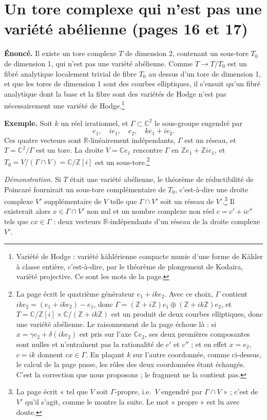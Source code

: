 \documentclass[11pt,a4paper]{article}
\begin{document}
\section*{Un tore complexe qui n'est pas une variété abélienne (pages 16 et 17)}

\textbf{Énoncé.} Il existe un tore complexe $T$ de dimension 2, contenant un
sous-tore $T_{0}$ de dimension 1, qui n'est pas une variété abélienne. Comme
$T \to T/T_{0}$ est un fibré analytique localement trivial de fibre $T_{0}$ au
dessus d'un tore de dimension 1, et que les tores de dimension 1 sont des
courbes elliptiques, il s'ensuit qu'un fibré analytique dont la base et la
fibre sont des variétés de Hodge n'est pas nécessairement une variété de
Hodge.\footnote{Variété de Hodge : variété kählérienne compacte munie d'une
forme de Kähler à classe entière, c'est-à-dire, par le théorème de plongement
de Kodaira, variété projective. Ce sont les mots de la page.}

\textbf{Exemple.} Soit $k$ un réel irrationnel, et $\Gamma \subset
\mathbb{C}^{2}$ le sous-groupe engendré par
\[
  e_{1}, \quad ie_{1}, \quad e_{2}, \quad ke_{1} + ie_{2} .
\]
Ces quatre vecteurs sont $\mathbb{R}$-linéairement indépendants, $\Gamma$ est un
réseau, et $T = \mathbb{C}^{2}/\Gamma$ est un tore. La droite $V =
\mathbb{C}e_{1}$ rencontre $\Gamma$ en $\mathbb{Z}e_{1} + \mathbb{Z}ie_{1}$, et
$T_{0} = V/(\Gamma \cap V) = \mathbb{C}/\mathbb{Z}[i]$ est un sous-tore.\footnote{La
page écrit le quatrième générateur $e_{1} + ike_{2}$. Avec ce choix, $\Gamma$
contient $ike_{2} = (e_{1} + ike_{2}) - e_{1}$, donc
$\Gamma = (\mathbb{Z} + i\mathbb{Z})e_{1} \oplus (\mathbb{Z} + ik\mathbb{Z})e_{2}$,
et $T = \mathbb{C}/\mathbb{Z}[i] \times \mathbb{C}/(\mathbb{Z} + ik\mathbb{Z})$
est un produit de deux courbes elliptiques, donc une variété abélienne. Le
raisonnement de la page échoue là : si $x = \gamma e_{2} +
\delta(ike_{2})$ est pris sur l'axe $\mathbb{C}e_{2}$, ses deux premières
composantes sont nulles et n'entraînent pas la rationalité de $c'$ et $c''$ ;
et en effet $x = e_{2}$, $c = ik$ donnent $cx \in \Gamma$. En plaçant $k$ sur
l'autre coordonnée, comme ci-dessus, le calcul de la page passe, les rôles des
deux coordonnées étant échangés. C'est la correction que nous proposons ; le
fragment ne la contient pas.}

\emph{Démonstration.} Si $T$ était une variété abélienne, le théorème de
réductibilité de Poincaré fournirait un sous-tore complémentaire de $T_{0}$,
c'est-à-dire une droite complexe $V'$ supplémentaire de $V$ telle que
$\Gamma \cap V'$ soit un réseau de $V'$.\footnote{La page écrit « tel que $V$
soit $\Gamma$-propre, i.e.\ $V$ engendré par $\Gamma \cap V$ » ; c'est de $V'$
qu'il s'agit, comme le montre la suite. Le mot « propre » est lu avec doute.}
Il existerait alors $x \in \Gamma \cap V'$ non nul et un nombre complexe non
réel $c = c' + ic''$ tels que $cx \in \Gamma$ : deux vecteurs
$\mathbb{R}$-indépendants d'un réseau de la droite complexe $V'$.
\end{document}
